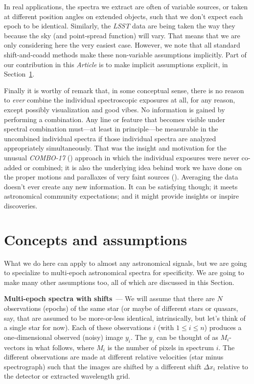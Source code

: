 \documentclass[modern]{aastex631}
\renewcommand{\paragraph}[1]{\medskip\par\noindent\textbf{#1}~---}
\newcommand{\documentname}{\textsl{Article}}
\newcommand{\sectionname}{Section}
\begin{document}
In real applications, the spectra we extract are often of variable sources, or taken at different position angles on extended objects, such that we don't expect each epoch to be identical.
Similarly, the \textsl{LSST} data are being taken the way they because the sky (and point-spread function) will vary.
That means that we are only considering here the very easiest case.
However, we note that all standard shift-and-coadd methods make these non-variable assumptions implicitly.
Part of our contribution in this \documentname{} is to make implicit assumptions explicit, in \sectionname~\ref{sec:assumptions}.

Finally it is worthy of remark that, in some conceptual sense, there is no reason to \emph{ever} combine the individual spectroscopic exposures at all, for any reason, except possibly visualization and good vibes.
No information is gained by performing a combination.
Any line or feature that becomes visible under spectral combination must---at least in principle---be measurable in the uncombined individual spectra if those individual spectra are analyzed appropriately simultaneously.
That was the insight and motivation for the unusual \textsl{COMBO-17} (\citealt{combo17}) approach in which the individual exposures were never co-added or combined; it is also the underlying idea behind work we have done on the proper motions and parallaxes of very faint sources (\citealt{undetectable}).
Averaging the data doesn't ever create any new information.
It can be satisfying though; it meets astronomical community expectations; and it might provide insights or inspire discoveries.

\section{Concepts and assumptions}\label{sec:assumptions}

What we do here can apply to almost any astronomical signals, but we are going to specialize to multi-epoch astronomical spectra for specificity.
We are going to make many other assumptions too, all of which are discussed in this \sectionname.

\paragraph{Multi-epoch spectra with shifts}
We will assume that there are $N$ observations (epochs) of the same star (or maybe of different stars or quasars, say, that are assumed to be more-or-less identical, intrinsically, but let's think of a single star for now).
Each of these observations $i$ (with $1\leq i\leq n$) produces a one-dimensional observed (noisy) image $y_i$.
The $y_i$ can be thought of as $M_i$-vectors in what follows, where $M_i$ is the number of pixels in spectrum $i$.
The different observations are made at different relative velocities (star minus spectrograph) such that the images are shifted by a different shift $\Delta x_i$ relative to the detector or extracted wavelength grid.
\end{document}
